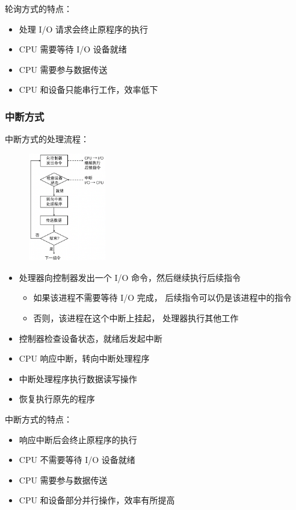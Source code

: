 \documentclass[cs4size,a4paper,10pt]{ctexart}
\begin{document}
	轮询方式的特点：
	\begin{itemize}
		\item 处理 I/O 请求会终止原程序的执行
		\item CPU 需要等待 I/O 设备就绪
		\item CPU 需要参与数据传送
		\item CPU 和设备只能串行工作，效率低下
	\end{itemize}


	\subsubsection{中断方式}
	中断方式的处理流程：
	\begin{figure}[H]
		\centering
		\includegraphics[width=0.3\textwidth]{img/4.1.2.4}
	\end{figure}
	\begin{itemize}
		\item 处理器向控制器发出一个 I/O 命令，然后继续执行后续指令
		\begin{itemize}
			\item 如果该进程不需要等待 I/O 完成， 后续指令可以仍是该进程中的指令
			\item 否则，该进程在这个中断上挂起， 处理器执行其他工作
		\end{itemize}
		\item 控制器检查设备状态，就绪后发起中断
		\item CPU 响应中断，转向中断处理程序
		\item 中断处理程序执行数据读写操作
		\item 恢复执行原先的程序
	\end{itemize}

	中断方式的特点：
	\begin{itemize}
		\item 响应中断后会终止原程序的执行
		\item CPU 不需要等待 I/O 设备就绪
		\item CPU 需要参与数据传送
		\item CPU 和设备部分并行操作，效率有所提高
	\end{itemize}
\end{document}
